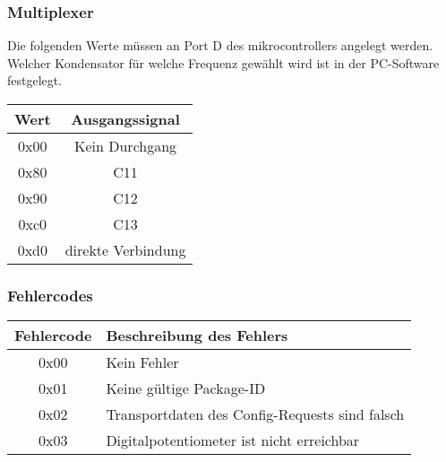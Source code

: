 \subsubsection*{Multiplexer}
Die folgenden Werte müssen an Port D des mikrocontrollers angelegt werden. Welcher Kondensator für welche Frequenz gewählt wird ist in der PC-Software festgelegt.
\begin{flushleft}
\begin{tabular}{c||c}
Wert & Ausgangssignal\\
\hline
\hline
0x00 & Kein Durchgang\\
\hline
0x80 & C11\\
\hline
0x90 & C12\\
\hline
0xc0 & C13\\
\hline
0xd0 & direkte Verbindung\\
\end{tabular}
\end{flushleft}

\subsubsection{Fehlercodes}

\begin{flushleft}
\begin{tabular}{c||l}
Fehlercode & Beschreibung des Fehlers \\
\hline
\hline
0x00 & Kein Fehler \\
\hline
0x01 & Keine gültige Package-ID \\
\hline
0x02 & Transportdaten des Config-Requests sind falsch \\
\hline
0x03 & Digitalpotentiometer ist nicht erreichbar \\

\end{tabular}
\end{flushleft}
